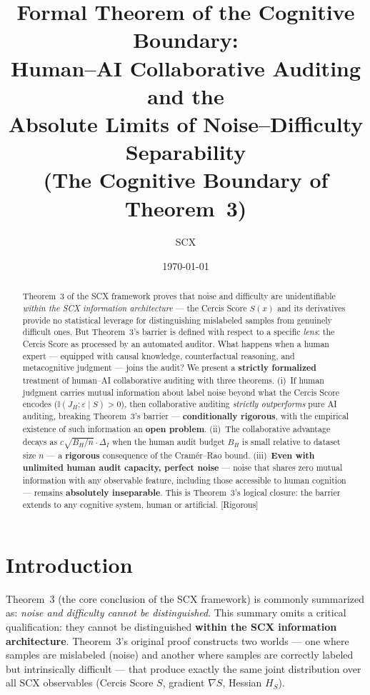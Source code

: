 \documentclass[12pt,a4paper]{article}
\title{\bfseries Formal Theorem of the Cognitive Boundary:\\
Human--AI Collaborative Auditing and the\\
Absolute Limits of Noise--Difficulty Separability\\
(The Cognitive Boundary of Theorem~3)}
\author{SCX}
\date{\today}
\newcommand{\rigorous}{\textcolor{green!50!black}{\small\textsf{[Rigorous]}}}
\newcommand{\I}{\mathbb{I}}
\begin{document}
\maketitle

\begin{abstract}
Theorem~3 of the \textsf{SCX} framework proves that noise and difficulty are
unidentifiable \emph{within the SCX information architecture} --- the Cercis
Score $S(x)$ and its derivatives provide no statistical leverage for
distinguishing mislabeled samples from genuinely difficult ones.  But
Theorem~3's barrier is defined with respect to a specific \emph{lens}: the
Cercis Score as processed by an automated auditor.  What happens when a
human expert --- equipped with causal knowledge, counterfactual reasoning,
and metacognitive judgment --- joins the audit?  We present a \textbf{strictly
formalized} treatment of human--AI collaborative auditing with three
theorems.  (i)~If human judgment carries mutual information about label noise
beyond what the Cercis Score encodes ($\I(J_H; \varepsilon \mid S) > 0$),
then collaborative auditing \emph{strictly outperforms} pure AI auditing,
breaking Theorem~3's barrier --- \textbf{conditionally rigorous}, with the
empirical existence of such information an \textbf{open problem}.
(ii)~The collaborative advantage decays as $c\sqrt{B_H/n} \cdot \Delta_I$
when the human audit budget $B_H$ is small relative to dataset size $n$ ---
a \textbf{rigorous} consequence of the Cram\'er--Rao bound.
(iii)~\textbf{Even with unlimited human audit capacity, perfect noise} ---
noise that shares zero mutual information with any observable feature,
including those accessible to human cognition --- remains \textbf{absolutely
inseparable}.  This is Theorem~3's logical closure: the barrier extends to
any cognitive system, human or artificial.  \rigorous
\end{abstract}

\section{Introduction}

Theorem~3 (the core conclusion of the \textsf{SCX} framework) is commonly summarized as: \textit{noise and difficulty cannot be distinguished}. This summary omits a critical qualification: they cannot be distinguished \textbf{within the SCX information architecture}. Theorem~3's original proof constructs two worlds --- one where samples are mislabeled (noise) and another where samples are correctly labeled but intrinsically difficult --- that produce exactly the same joint distribution over all SCX observables (Cercis Score $S$, gradient $\nabla S$, Hessian $H_S$).
\end{document}
